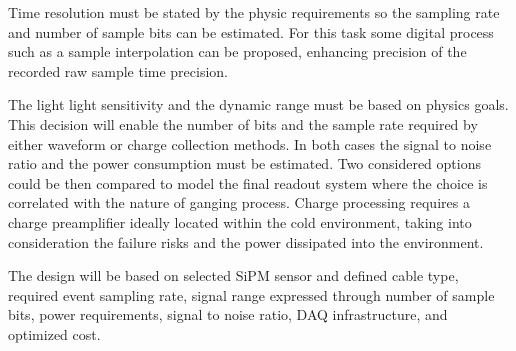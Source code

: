 Time resolution must be stated by the physic requirements so the sampling rate and number of sample bits can be estimated. For this task 
some digital process such as a sample interpolation can be proposed, enhancing precision of the recorded raw sample time precision.

The light light sensitivity and the dynamic range must be based on physics goals. This decision will enable the number of bits and the sample 
rate required by either waveform or charge collection methods. In both cases the signal to noise ratio and the power consumption must be estimated. 
Two considered options could be then compared to model the final readout system where the choice is  correlated with the nature of ganging process. 
Charge processing requires a charge preamplifier ideally located within the cold environment, taking into consideration the failure risks and the power 
dissipated into the environment.

The design will be based on selected SiPM sensor and defined cable type, required event sampling rate, signal range expressed 
through number of sample bits, power requirements, signal to noise ratio, DAQ infrastructure, and optimized cost.

